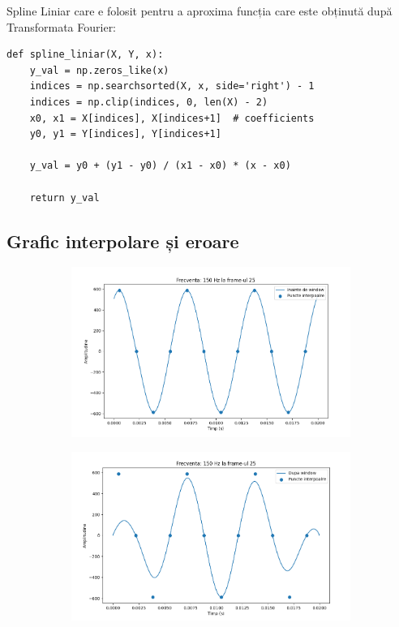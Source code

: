 \documentclass[12pt]{article}
\begin{document}
Spline Liniar care e folosit pentru a aproxima funcția care este obținută după Transformata Fourier:

\begin{lstlisting}
def spline_liniar(X, Y, x):
    y_val = np.zeros_like(x)
    indices = np.searchsorted(X, x, side='right') - 1
    indices = np.clip(indices, 0, len(X) - 2)
    x0, x1 = X[indices], X[indices+1]  # coefficients
    y0, y1 = Y[indices], Y[indices+1]
    
    y_val = y0 + (y1 - y0) / (x1 - x0) * (x - x0)

    return y_val
\end{lstlisting}

\subsection{Grafic interpolare și eroare}

\begin{figure}[H]
	\centering
	\begin{subfigure}[b]{1\textwidth}
		\includegraphics[width=\linewidth]{grafic1.png}
	\end{subfigure}
	\hfill
	\begin{subfigure}[b]{1\textwidth}
		\includegraphics[width=\linewidth]{grafic2.png}
	\end{subfigure}
\end{figure}
\end{document}
